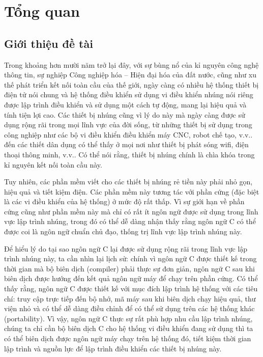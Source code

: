 \chapter{Tổng quan}
\section{Giới thiệu đề tài}
Trong khoảng hơn mười năm trở lại đây, với sự bùng nổ của kỉ nguyên công nghệ thông tin, sự nghiệp Công nghiệp hóa -- Hiện đại hóa của đất nước, cũng như xu thế phát triển kết nối toàn cầu của thế giới, ngày càng có nhiều hệ thống thiết bị điện tử nói chung và hệ thống điều khiển sử dụng vi điều khiển nhúng nói riêng được lập trình điều khiển và sử dụng một cách tự động, mang lại hiệu quả và tính tiện lợi cao. Các thiết bị nhúng cũng vì lý do này mà ngày càng được sử dụng rộng rãi trong mọi lĩnh vực của đời sống, từ những thiết bị sử dụng trong công nghiệp như các bộ vi điều khiển điều khiển máy CNC, robot chế tạo, v.v.. đến các thiết dân dụng có thể thấy ở mọi nơi như thiết bị phát sóng wifi, điện thoại thông minh, v.v.. Có thể nói rằng, thiết bị nhúng chính là chìa khóa trong kỉ nguyên kết nối toàn cầu này.

Tuy nhiên, các phần mềm viết cho các thiết bị nhúng rẻ tiền này phải nhỏ gọn, hiệu quả và tiết kiệm điện. Các phần mềm này tương tác với phần cứng (đặc biệt là các vi điều khiển của hệ thống) ở mức độ rất thấp. Vì sự giới hạn về phần cứng cũng như phần mềm này mà chỉ có rất ít ngôn ngữ được sử dụng trong lĩnh vực lập trình nhúng, trong đó có thể dễ dàng nhận thấy rằng ngôn ngữ C có thể được coi là ngôn ngữ chuẩn chủ đạo, thống trị lĩnh vực lập trình nhúng này.

Để hiểu lý do tại sao ngôn ngữ C lại được sử dụng rộng rãi trong lĩnh vực lập trình nhúng này, ta cần nhìn lại lịch sử: chính vì ngôn ngữ C được thiết kế trong thời gian mà bộ biên dịch (compiler) phải thực sự đơn giản, ngôn ngữ C sau khi biên dịch được hướng đến kết quả ngôn ngữ máy để chạy trên phần cứng. Có thể thấy rằng, ngôn ngữ C được thiết kế với mục đích lập trình hệ thống với các tiêu chí: truy cập trực tiếp đến bộ nhớ, mã máy sau khi biên dịch chạy hiệu quả, thư viện nhỏ và có thể dễ dàng điều chỉnh để có thể sử dụng trên các hệ thống khác (portability). Vì vậy, ngôn ngữ C thực sự rất phù hợp nhu cầu lập trình nhúng, chúng ta chỉ cần bộ biên dịch C cho hệ thống vi điều khiển đang sử dụng thì ta có thể biên dịch được ngôn ngữ máy chạy trên hệ thống đó, tiết kiệm thời gian lập trình và nguồn lực để lập trình điều khiển các thiết bị nhúng này.

